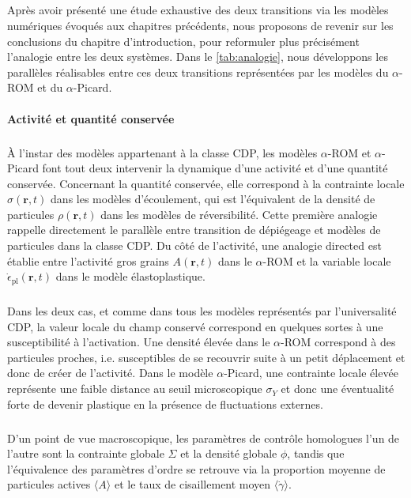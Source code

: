 \subparagraph{}Après avoir présenté une étude exhaustive des deux transitions via les modèles numériques évoqués aux chapitres précédents, nous proposons de revenir sur les conclusions du chapitre d'introduction, pour reformuler plus précisément l'analogie entre les deux systèmes. Dans le \autoref{tab:analogie}, nous développons les parallèles réalisables entre ces deux transitions représentées par les modèles du $\alpha$-ROM et du $\alpha$-Picard.

\paragraph{Activité et quantité conservée}

\subparagraph{}\`A l'instar des modèles appartenant à la classe CDP, les modèles $\alpha$-ROM et $\alpha$-Picard font tout deux intervenir la dynamique d'une activité et d'une quantité conservée. Concernant la quantité conservée, elle correspond à la contrainte locale $\sigma(\mathbf{r},t)$ dans les modèles d'écoulement, qui est l'équivalent de la densité de particules $\rho(\mathbf{r}, t)$ dans les modèles de réversibilité. Cette première analogie rappelle directement le parallèle entre transition de dépiégeage et modèles de particules dans la classe CDP. Du côté de l'activité, une analogie directed est établie entre l'activité gros grains $A(\mathbf{r}, t)$ dans le $\alpha$-ROM et la variable locale $\dot{\epsilon}_\text{pl}(\mathbf{r}, t)$ dans le modèle élastoplastique.

\subparagraph{}Dans les deux cas, et comme dans tous les modèles représentés par l'universalité CDP, la valeur locale du champ conservé correspond en quelques sortes à une susceptibilité à l'activation. Une densité élevée dans le $\alpha$-ROM correspond à des particules proches, i.e. susceptibles de se recouvrir suite à un petit déplacement et donc de créer de l'activité. Dans le modèle $\alpha$-Picard, une contrainte locale élevée représente une faible distance au seuil microscopique $\sigma_Y$ et donc une éventualité forte de devenir plastique en la présence de fluctuations externes.

\subparagraph{}D'un point de vue macroscopique, les paramètres de contrôle homologues l'un de l'autre sont la contrainte globale $\Sigma$ et la densité globale $\phi$, tandis que l'équivalence des paramètres d'ordre se retrouve via la proportion moyenne de particules actives $\langle A \rangle $ et le taux de cisaillement moyen $\langle \dot{\gamma}\rangle$.

